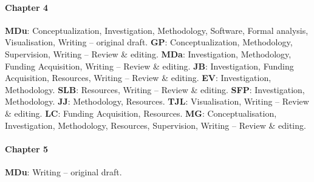 \paragraph{Chapter 4}
\textbf{MDu}: Conceptualization, Investigation, Methodology, Software, Formal analysis, Visualisation, Writing – original draft. \textbf{GP}: Conceptualization, Methodology, Supervision, Writing – Review \& editing. \textbf{MDa}: Investigation, Methodology, Funding Acquisition, Writing – Review \& editing. \textbf{JB}: Investigation, Funding Acquisition, Resources, Writing – Review \& editing. \textbf{EV}: Investigation, Methodology. \textbf{SLB}: Resources, Writing – Review \& editing. \textbf{SFP}: Investigation, Methodology. \textbf{JJ}: Methodology, Resources. \textbf{TJL}: Visualisation, Writing – Review \& editing. \textbf{LC}: Funding Acquisition, Resources. \textbf{MG}: Conceptualisation, Investigation, Methodology, Resources, Supervision, Writing – Review \& editing.


\paragraph{Chapter 5}
\textbf{MDu}: Writing – original draft.

